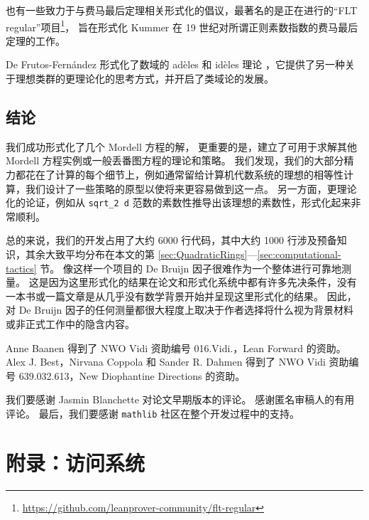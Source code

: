 \documentclass[sigplan,10pt,nonacm,
screen]{acmart} \settopmatter{printfolios=true,printccs=false,printacmref=false}
\newcommand{\tb}[1]{\todo[color=cyan]{TB: #1}}
\newcommand{\sd}[1]{\todo[color=yellow]{SD: #1}}
\newcommand{\mathlib}{\lstinline{mathlib}\xspace}
\begin{document}
也有一些致力于与费马最后定理相关形式化的倡议，最著名的是正在进行的“FLT regular”项目\footnote{\url{https://github.com/leanprover-community/flt-regular}}，%
旨在形式化 Kummer 在 19 世纪对所谓正则素数指数的费马最后定理的工作。

De Frutos-Fernández 形式化了数域的 adèles 和 idèles 理论 \cite{de_frutos-fernandez_formalizing_2022}，它提供了另一种关于理想类群的更理论化的思考方式，并开启了类域论的发展。

\subsection{结论}\label{sec:Conclusion}

我们成功形式化了几个 Mordell 方程的解，
更重要的是，建立了可用于求解其他 Mordell 方程实例或一般丢番图方程的理论和策略。
我们发现，我们的大部分精力都花在了计算的每个细节上，例如通常留给计算机代数系统的理想的相等性计算，我们设计了一些策略的原型以使将来更容易做到这一点。
另一方面，更理论化的论证，例如从 \lstinline{sqrt_2 d} 范数的素数性推导出该理想的素数性，形式化起来非常顺利。

总的来说，我们的开发占用了大约 6000 行代码，其中大约 1000 行涉及预备知识，其余大致平均分布在本文的第 \ref{sec:QuadraticRings}---\ref{sec:computational-tactics} 节。 %
像这样一个项目的 De Bruijn 因子很难作为一个整体进行可靠地测量。
这是因为这里形式化的结果在论文和形式化系统中都有许多先决条件，没有一本书或一篇文章是从几乎没有数学背景开始并呈现这里形式化的结果。
因此，对 De Bruijn 因子的任何测量都很大程度上取决于作者选择将什么视为背景材料或非正式工作中的隐含内容。

\begin{acks}
Anne Baanen 得到了 NWO Vidi 资助编号 016.Vidi.，Lean Forward 的资助。
Alex J. Best，Nirvana Coppola 和 Sander R. Dahmen 得到了 NWO Vidi 资助编号 639.032.613，New Diophantine Directions 的资助。

我们要感谢 Jasmin Blanchette 对论文早期版本的评论。
感谢匿名审稿人的有用评论。
最后，我们要感谢 \mathlib 社区在整个开发过程中的支持。
\end{acks}

\appendix

\section{附录：访问系统}\label{app:access}
\end{document}
